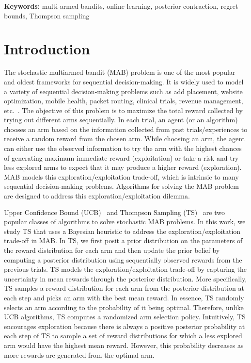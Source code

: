 \documentclass[11pt]{article}
\newenvironment{keywords}{\par\vspace{0.5em}\noindent\textbf{Keywords:} }{\par}
\begin{document}
\begin{keywords}
  multi-armed bandits, online learning,  posterior contraction, regret bounds, Thompson sampling
\end{keywords}

\section{Introduction}

 The stochastic multiarmed bandit (MAB) problem is one of the most popular and oldest frameworks for sequential decision-making. It is widely used to model a variety of sequential decision-making problems such as add placement, website optimization, mobile health, packet routing, clinical trials, revenue management, etc.~\cite[Chapter 1]{Bubeck2012}. The objective of this problem is to maximize the total reward collected by trying out different arms sequentially. In each trial, an  agent (or an algorithm) chooses an arm based on the information collected from past trials/experiences to receive a random reward from the chosen arm. While choosing an arm, the agent can either use the observed information to try the arm with the highest chances of generating maximum immediate reward (exploitation) or take a risk and try less explored arms to expect that it may produce a higher reward (exploration). MAB models this exploration/exploitation trade-off, which is intrinsic to many sequential decision-making problems. Algorithms for solving the MAB problem are designed to address this exploration/exploitation dilemma. 

Upper Confidence Bound (UCB)~\citep{lai1985asymptotically,lai1987adaptive,Auer2002} and Thompson Sampling (TS)~\citep{THOMPSON1933} are two popular classes of algorithms to solve stochastic MAB problems. In this work, we study TS that uses a Bayesian heuristic to address the exploration/exploitation trade-off in MAB.  In TS, we first posit a prior distribution on the parameters of the reward distribution for each arm and then update the prior belief by computing a posterior distribution using sequentially observed rewards from the previous trials. TS models the exploration/exploitation trade-off by capturing the uncertainty in mean rewards through the posterior distribution. More specifically, TS samples a reward distribution for each arm from the posterior distribution at each step and picks an arm with the best mean reward. In essence, TS randomly selects an arm according to the probability of it being optimal. Therefore, unlike UCB algorithms, TS computes a randomized arm selection policy. Intuitively, TS encourages exploration because there is always a positive posterior probability at each step of TS to sample a set of reward distributions for which a less explored arm would have the highest mean reward. {However, this probability decreases as more rewards are generated from the optimal arm. } 
\end{document}
